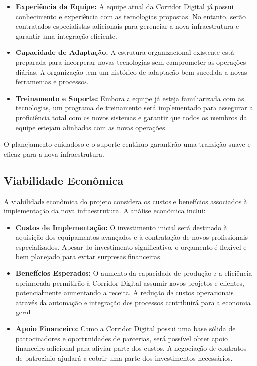 \begin{itemize}
    \item \textbf{Experiência da Equipe:} A equipe atual da Corridor Digital já possui conhecimento e experiência com as tecnologias propostas. No entanto, serão contratados especialistas adicionais para gerenciar a nova infraestrutura e garantir uma integração eficiente.
    \item \textbf{Capacidade de Adaptação:} A estrutura organizacional existente está preparada para incorporar novas tecnologias sem comprometer as operações diárias. A organização tem um histórico de adaptação bem-sucedida a novas ferramentas e processos.
    \item \textbf{Treinamento e Suporte:} Embora a equipe já esteja familiarizada com as tecnologias, um programa de treinamento será implementado para assegurar a proficiência total com os novos sistemas e garantir que todos os membros da equipe estejam alinhados com as novas operações.
\end{itemize}

O planejamento cuidadoso e o suporte contínuo garantirão uma transição suave e eficaz para a nova infraestrutura.

\subsection{Viabilidade Econômica}
A viabilidade econômica do projeto considera os custos e benefícios associados à implementação da nova infraestrutura. A análise econômica inclui:

\begin{itemize}
    \item \textbf{Custos de Implementação:} O investimento inicial será destinado à aquisição dos equipamentos avançados e à contratação de novos profissionais especializados. Apesar do investimento significativo, o orçamento é flexível e bem planejado para evitar surpresas financeiras.
    \item \textbf{Benefícios Esperados:} O aumento da capacidade de produção e a eficiência aprimorada permitirão à Corridor Digital assumir novos projetos e clientes, potencialmente aumentando a receita. A redução de custos operacionais através da automação e integração dos processos contribuirá para a economia geral.
    \item \textbf{Apoio Financeiro:} Como a Corridor Digital possui uma base sólida de patrocinadores e oportunidades de parcerias, será possível obter apoio financeiro adicional para aliviar parte dos custos. A negociação de contratos de patrocínio ajudará a cobrir uma parte dos investimentos necessários.
\end{itemize}

